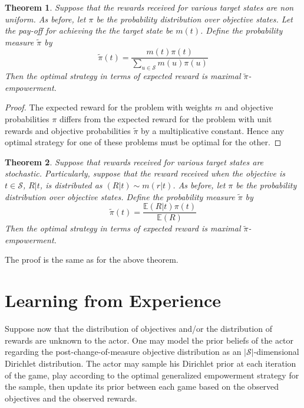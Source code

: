 \documentclass{article}
\newtheorem{theorem}{Theorem}
\newcommand{\EE}{\mathbb{E}}
\newcommand{\Ss}{\mathcal{S}}
\begin{document}
\begin{theorem}
Suppose that the rewards received for various target states are non uniform. As before, let $\pi$ be the probability distribution over objective states. 
Let the pay-off for achieving the the target state be $m(t)$. 
Define the probability measure $\tilde{\pi}$ by
\[\tilde{\pi}(t)=\frac{m(t)\pi(t)}{\sum_{u\in\Ss} m(u)\pi(u)}\] 
Then the optimal strategy in terms of expected reward is maximal $\tilde{\pi}$-empowerment. 
\end{theorem}
\begin{proof}
The expected reward for the problem with weights $m$ and objective probabilities $\pi$ differs from the expected reward for the problem with unit rewards and objective probabilities $\tilde{\pi}$ by a multiplicative constant. Hence any optimal strategy for one of these problems must be optimal for the other. 
\end{proof}
\begin{theorem} 
Suppose that rewards received for various target states are stochastic. Particularly, suppose that the reward received when the objective is $t\in\Ss$, $R|t$, is distributed as $(R|t)\sim m(r|t)$. As before, let $\pi$ be the probability distribution over objective states. Define the probability measure $\tilde{\pi}$ by
\[\tilde{\pi}(t)=\frac{\EE(R|t)\pi(t)}{\EE(R)}\] 
Then the optimal strategy in terms of expected reward is maximal $\tilde{\pi}$-empowerment. 
\end{theorem}
The proof is the same as for the above theorem.



\section{Learning from Experience}
Suppose now that the distribution of objectives and/or the distribution of rewards are unknown to the actor. 
One may model the prior beliefs of the actor regarding the post-change-of-measure objective distribution as an $|\Ss|$-dimensional Dirichlet distribution. 
The actor may sample his Dirichlet prior at each iteration of the game, play according to the optimal generalized empowerment strategy for the sample, then update its prior between each game based on the observed objectives and the observed rewards.


\newpage


\end{document}
